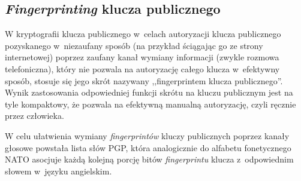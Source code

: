 \subsection{\emph{Fingerprinting} klucza publicznego}
W kryptografii klucza publicznego w~celach autoryzacji klucza publicznego
pozyskanego w~niezaufany sposób (na przykład ściągając go ze strony
internetowej) poprzez zaufany kanał wymiany informacji (zwykle rozmowa
telefoniczna), który nie pozwala na autoryzację całego klucza w~efektywny
sposób, stosuje się jego skrót nazywany ,,fingerprintem klucza publicznego''.
Wynik zastosowania odpowiedniej funkcji skrótu na kluczu publicznym jest na tyle
kompaktowy, że pozwala na efektywną manualną autoryzację, czyli ręcznie przez
człowieka.

W celu ułatwienia wymiany \emph{fingerprintów} kluczy publicznych poprzez kanały
głosowe powstała lista słów PGP, która analogicznie do alfabetu fonetycznego
NATO asocjuje każdą kolejną porcję bitów \emph{fingerprintu} klucza
z~odpowiednim słowem w~języku angielskim.

